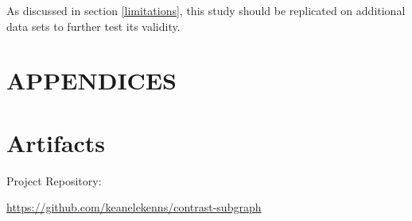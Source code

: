\documentclass[sigconf]{acmart}
\begin{document}
As discussed in section \ref{limitations}, this study should be replicated on additional data sets to further test its validity.




\appendix
\section*{APPENDICES}
\section{Artifacts} \label{artifacts}

Project Repository:

\url{https://github.com/keanelekenns/contrast-subgraph}
\end{document}
